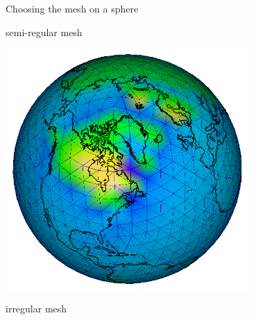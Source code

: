 \documentclass{beamer}
\begin{document}
\begin{frame}{Choosing the mesh on a sphere}
\vspace{0.7cm}
\begin{minipage}[c]{0.4\textwidth}
\centering
\footnotesize{semi-regular mesh}

\includegraphics[width=0.7\textwidth]{images/GIA_mesh1}
\vspace{0.5cm}

\footnotesize{irregular mesh}


\end{minipage}
\end{frame}
\end{document}
